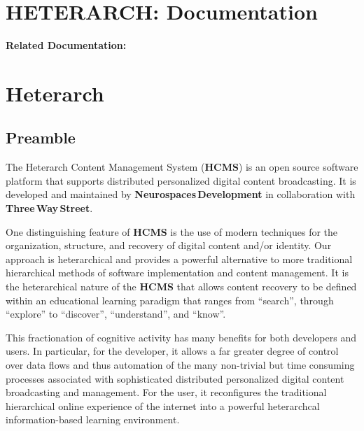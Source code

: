 \documentclass[12pt]{article}
\begin{document}
\section*{HETERARCH: Documentation}

{\bf Related Documentation:}

\section*{Heterarch}

\subsection*{Preamble}

The Heterarch Content Management System ({\bf \small HCMS}) is an open source software platform that supports distributed personalized digital content broadcasting. It is developed and maintained by {\bf Neurospaces\,Development} in collaboration with {\bf Three\,Way\,Street}.

One distinguishing feature of {\bf \small HCMS} is the use of modern techniques for the organization, structure, and recovery of digital content and/or identity. Our approach is heterarchical and provides a powerful alternative to more traditional hierarchical methods of software implementation and content management. It is the heterarchical nature of the {\bf \small HCMS} that allows content recovery to be defined within an educational learning paradigm that ranges from ``search'', through ``explore'' to ``discover'', ``understand'', and ``know''.

This fractionation of cognitive activity has many benefits for both developers and users. In particular, for the developer, it allows a far greater degree of control over data flows and thus automation of the many non-trivial but time consuming processes associated with sophisticated distributed personalized digital content broadcasting and management. For the user, it reconfigures the traditional hierarchical online experience of the internet into a powerful heterarchcal information-based learning environment.
\end{document}
